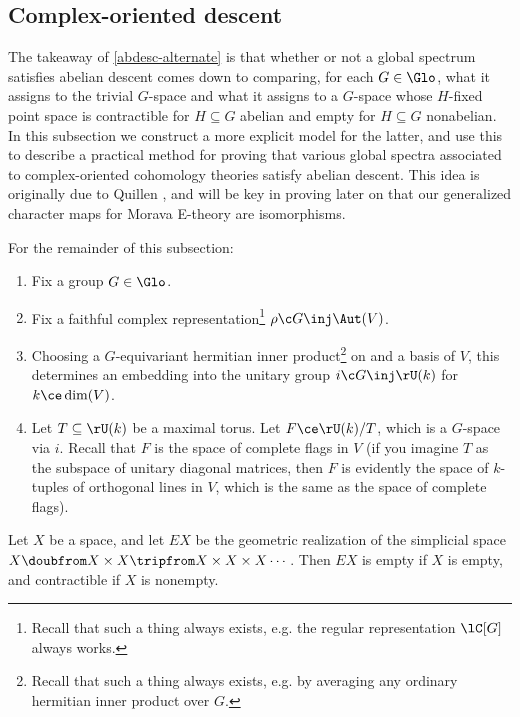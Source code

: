 \subsection{Complex-oriented descent}
\label{abdesc-codesc}

The takeaway of \cref{abdesc-alternate} is that whether or not a
global spectrum satisfies abelian descent comes down to comparing, for
each $G \in \Glo$, what it assigns to the trivial $G$-space and what
it assigns to a $G$-space whose $H$-fixed point space is contractible
for $H \subseteq G$ abelian and empty for $H \subseteq G$
nonabelian. In this subsection we construct a more explicit model for
the latter, and use this to describe a practical method for proving
that various global spectra associated to complex-oriented cohomology
theories satisfy abelian descent. This idea is originally due to
Quillen \cite{quillen-equivariant-i}, and will be key in proving later
on that our generalized character maps for Morava E-theory are
isomorphisms.

\begin{notation}
  \label{abdesc-codesc-ntn}
  For the remainder of this subsection:
  \begin{enumerate}
  \item Fix a group $G \in \Glo$.
  \item Fix a faithful complex representation\footnote{Recall that
      such a thing always exists, e.g. the regular representation
      $\lC[G]$ always works.}  $\rho \c G \inj \Aut(V)$.
  \item Choosing a $G$-equivariant hermitian inner
    product\footnote{Recall that such a thing always exists, e.g. by
      averaging any ordinary hermitian inner product over $G$.} on and
    a basis of $V$, this determines an embedding into the unitary
    group $i \c G \inj \rU(k)$ for $k \ce \dim(V)$.
  \item \label{abdesc-flag-variety} Let $T \subseteq \rU(k)$ be a
    maximal torus. Let $F \ce \rU(k)/T$, which is a $G$-space via
    $i$. Recall that $F$ is the space of complete flags in $V$ (if you
    imagine $T$ as the subspace of unitary diagonal matrices, then $F$
    is evidently the space of $k$-tuples of orthogonal lines in $V$,
    which is the same as the space of complete flags).
  \end{enumerate}
\end{notation}

\begin{lemma}
  \label{abdesc-contractify}
  Let $X$ be a space, and let $EX$ be the geometric realization of the
  simplicial space $X \doubfrom X \times X \tripfrom X \times X \times
  X \cdots$. Then $EX$ is empty if $X$ is empty, and contractible if
  $X$ is nonempty.
\end{lemma}

